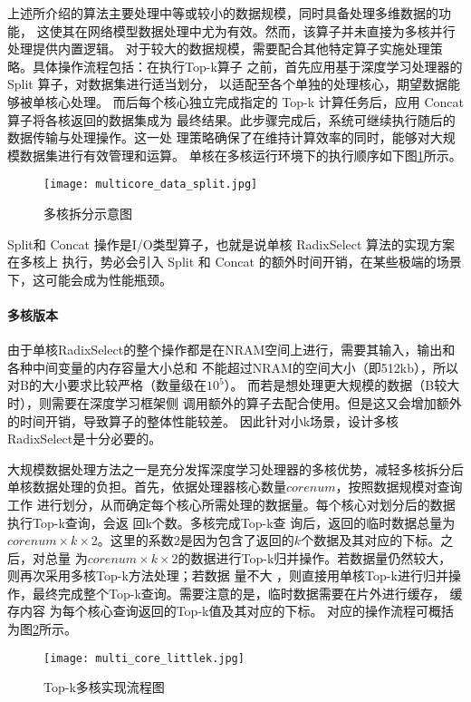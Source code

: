 上述所介绍的算法主要处理中等或较小的数据规模，同时具备处理多维数据的功能，
这使其在网络模型数据处理中尤为有效。然而，该算子并未直接为多核并行处理提供内置逻辑。
对于较大的数据规模，需要配合其他特定算子实施处理策略。具体操作流程包括：在执行Top-k算子
之前，首先应用基于深度学习处理器的 Split 算子，对数据集进行适当划分，
以适配至各个单独的处理核心，期望数据能够被单核心处理。
而后每个核心独立完成指定的 Top-k 计算任务后，应用 Concat 算子将各核返回的数据集成为
最终结果。此步骤完成后，系统可继续执行随后的数据传输与处理操作。这一处
理策略确保了在维持计算效率的同时，能够对大规模数据集进行有效管理和运算。
单核在多核运行环境下的执行顺序如下图\ref{fig:duohe_split}所示。
\begin{figure}[ht]
    \centering
    \texttt{[image: multicore\_data\_split.jpg]}
    \caption{多核拆分示意图}
    \label{fig:duohe_split}
\end{figure}

Split和 Concat 操作是I/O类型算子，也就是说单核 RadixSelect 算法的实现方案在多核上
执行，势必会引入 Split 和 Concat 的额外时间开销，在某些极端的场景下，这可能会成为性能瓶颈。


\paragraph{多核版本}
由于单核RadixSelect的整个操作都是在NRAM空间上进行，需要其输入，输出和各种中间变量的内存容量大小总和
不能超过NRAM的空间大小（即512kb），所以对B的大小要求比较严格（数量级在$10^5$）。
而若是想处理更大规模的数据（B较大时），则需要在深度学习框架侧
调用额外的算子去配合使用。但是这又会增加额外的时间开销，导致算子的整体性能较差。
因此针对小k场景，设计多核RadixSelect是十分必要的。

大规模数据处理方法之一是充分发挥深度学习处理器的多核优势，减轻多核拆分后单核数据处理的负担。首先，依据处理器核心数量\(corenum\)，按照数据规模对查询工作
进行划分，从而确定每个核心所需处理的数据量。每个核心对划分后的数据执行Top-k查询，会返
回k个数。多核完成Top-k查
询后，返回的临时数据总量为\(corenum×k×2\)。这里的系数\(2\)是因为包含了返回的\(k\)个数据及其对应的下标。之后，对总量
为\(corenum×k×2\)的数据进行Top-k归并操作。若数据量仍然较大，则再次采用多核Top-k方法处理；若数据
量不大
，则直接用单核Top-k进行归并操作，最终完成整个Top-k查询。需要注意的是，临时数据需要在片外进行缓存，
缓存内容
为每个核心查询返回的Top-k值及其对应的下标。
对应的操作流程可概括为图\ref{fig:multi_core_littlek}所示。
\begin{figure}[ht]
    \centering
    \texttt{[image: multi\_core\_littlek.jpg]}
    \caption{Top-k多核实现流程图}
    \label{fig:multi_core_littlek}
\end{figure}
    
